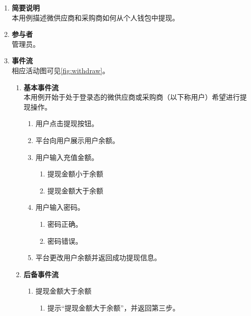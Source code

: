\begin{enumerate}
	\item \textbf{简要说明}  \\ 本用例描述微供应商和采购商如何从个人钱包中提现。
	\item \textbf{参与者} \\ 管理员。
	\item \textbf{事件流} \\ 相应活动图可见\autoref{fig:withdraw}。
	\begin{enumerate} 
        \item \textbf{基本事件流} \\ 本用例开始于处于登录态的微供应商或采购商（以下称用户）希望进行提现操作。
        \begin{enumerate}
            \item 用户点击提现按钮。
            \item 平台向用户展示用户余额。
            \item 用户输入充值金额。
            \begin{enumerate}
                \item 提现金额小于余额
                \item 提现金额大于余额
            \end{enumerate}
            \item 用户输入密码。
            \begin{enumerate}
                \item 密码正确。
                \item 密码错误。
            \end{enumerate}
            \item 平台更改用户余额并返回成功提现信息。
        \end{enumerate}
        \item \textbf{后备事件流}
            \begin{enumerate}
                \item 提现金额大于余额
            \begin{enumerate}
                \item 提示“提现金额大于余额”，并返回第三步。
            \end{enumerate}
            

\end{enumerate}
\end{enumerate}
\end{enumerate}
